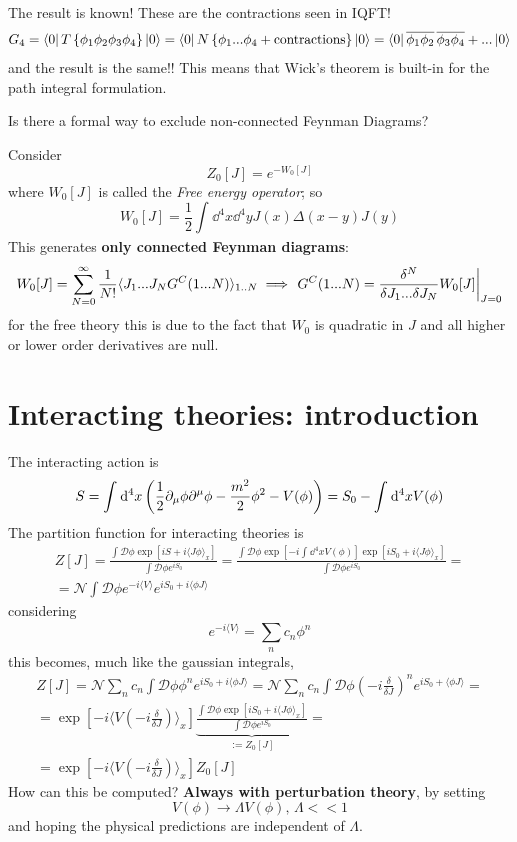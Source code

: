 The result is known! These are the contractions seen in IQFT!
\[
    G_4 = \bra{0}T\left\{\phi _1\phi _2\phi _3\phi _4\right\}\ket{0} = 
    \bra{0} N\left\{\phi _1...\phi _4 + \text{contractions}\right\}\ket{0}=
    \bra{0}\overline{\phi_1\phi _2}\,\overline{\phi_3\phi _4} + ...\ket{0}
\]
and the result is the same!! This means that Wick's theorem is built-in for the
path integral formulation.

Is there a formal way to exclude non-connected Feynman Diagrams?

Consider
\[
    Z_0[J]= e^{-W_0[J]}
\]
where $W_0[J]$ is called the \textit{Free energy operator}; so
\[
    W_0[J] = \frac{1}{2}\int_{}^{} \dd ^4x\dd^4y J(x)\Delta(x-y)J(y)
\]
This generates \textbf{only connected Feynman diagrams}:
\[
W_0[J]=\sum_{N=0}^{\infty} \frac{1}{N!}\langle J_1...J_NG^C(1...N)\rangle_{1..N}
\implies \eval{G^C(1...N)=\frac{\delta^N}{\delta J_1...\delta J_N}W_0[J]}_{J=0}
\]
for the free theory this is due to the fact that $W_0$ is quadratic in $J$ and
all higher or lower order derivatives are null.

\section{Interacting theories: introduction}
The interacting action is
\[
    S=\int_{}^{} \dd ^4x\left(\frac{1}{2}\partial_\mu\phi \partial^\mu\phi -\frac{m^2}{2}
    \phi^2 -V(\phi)\right) = S_0 - \int_{}^{} \dd ^4x V(\phi)
\]
The partition function for interacting theories is
\begin{gather*}
    Z[J]=\frac{\int \mathcal{D}\phi
    \exp\left[iS+i\langle J\phi \rangle_x\right]}
    {\int \mathcal{D}\phi e^{iS_0}} = 
    \frac{\int \mathcal{D}\phi
    \exp\left[ -i\int_{}^{} \dd^4x V(\phi) \right]
    \exp\left[iS_0+i\langle J\phi \rangle_x\right]}
    {\int \mathcal{D}\phi e^{iS_0}} = \\
    =\mathcal{N} \int \mathcal{D}\phi e^{-i\langle V\rangle}e^{iS_0+i\langle 
    \phi J\rangle}
\end{gather*}
considering
\[
    e^{-i\langle V\rangle }=\sum_{n}^{} c_n\phi^n 
\]
this becomes, much like the gaussian integrals,
\begin{gather*}
    Z[J]=\mathcal{N}\sum_{n}^{} c_n \int \mathcal{D}\phi \phi^ne^{iS_0+i\langle
    \phi J\rangle } = \mathcal{N}\sum_{n}^{} c_n\int \mathcal{D}\phi \left(
    -i\frac{\delta}{\delta J}\right)^ne^{iS_0+\langle \phi J\rangle }=\\
    =\exp\left[ -i\langle V\left(-i\frac{\delta }{\delta J}\right)
    \rangle_x\right]\underbrace{\frac{\int \mathcal{D}\phi \exp\left[ iS_0
    +i\langle J\phi\rangle_x  \right]}{\int \mathcal{D}\phi e^{iS_0}}}_{:=Z_0[J]}=
    \\=\exp\left[ -i\langle V\left(-i\frac{\delta }{\delta J}\right)
    \rangle_x\right] Z_0[J]
\end{gather*}
How can this be computed? \textbf{Always with perturbation theory}, by
setting 
\[
    V(\phi)\to\Lambda V(\phi),\,\Lambda <<1
\]
and hoping the physical predictions are independent of $\Lambda $. 

